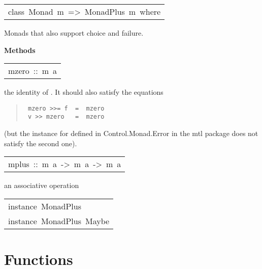 \begin{haddockdesc}
\item[\begin{tabular}{@{}l}
class\ Monad\ m\ =>\ MonadPlus\ m\ where
\end{tabular}]\haddockbegindoc
Monads that also support choice and failure.
\par

\haddockpremethods{}\textbf{Methods}
\begin{haddockdesc}
\item[\begin{tabular}{@{}l}
mzero\ ::\ m\ a
\end{tabular}]\haddockbegindoc
the identity of .  It should also satisfy the equations
\par
\begin{quote}
{\haddockverb\begin{verbatim}
 mzero >>= f  =  mzero
 v >> mzero   =  mzero
\end{verbatim}}
\end{quote}
(but the instance for  defined in Control.Monad.Error
 in the mtl package does not satisfy the second one).
\par

\end{haddockdesc}
\begin{haddockdesc}
\item[\begin{tabular}{@{}l}
mplus\ ::\ m\ a\ ->\ m\ a\ ->\ m\ a
\end{tabular}]\haddockbegindoc
an associative operation
\par

\end{haddockdesc}
\end{haddockdesc}
\begin{haddockdesc}
\item[\begin{tabular}{@{}l}
instance\ MonadPlus\ {\char 91}{\char 93}\\instance\ MonadPlus\ Maybe
\end{tabular}]
\end{haddockdesc}
\section{Functions
}
